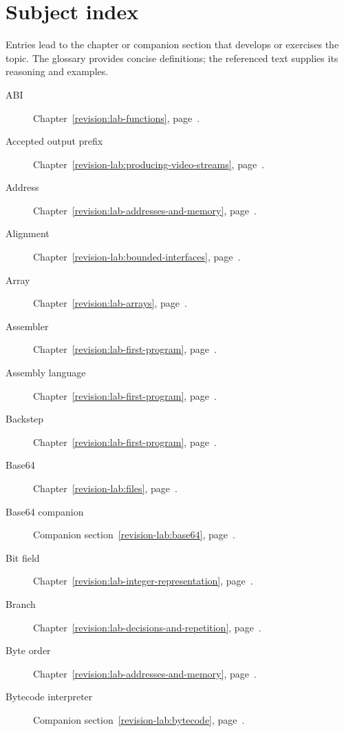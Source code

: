 \chapter*{Subject index}
\label{revision:subject-index}

Entries lead to the chapter or companion section that develops or exercises the topic. The glossary
provides concise definitions; the referenced text supplies its reasoning and examples.

\begin{description}
  \item[ABI] Chapter~\ref{revision:lab-functions}, page~\pageref{revision:lab-functions}.
  \item[Accepted output prefix] Chapter~\ref{revision-lab:producing-video-streams}, page~\pageref{revision-lab:producing-video-streams}.
  \item[Address] Chapter~\ref{revision:lab-addresses-and-memory}, page~\pageref{revision:lab-addresses-and-memory}.
  \item[Alignment] Chapter~\ref{revision-lab:bounded-interfaces}, page~\pageref{revision-lab:bounded-interfaces}.
  \item[Array] Chapter~\ref{revision:lab-arrays}, page~\pageref{revision:lab-arrays}.
  \item[Assembler] Chapter~\ref{revision:lab-first-program}, page~\pageref{revision:lab-first-program}.
  \item[Assembly language] Chapter~\ref{revision:lab-first-program}, page~\pageref{revision:lab-first-program}.
  \item[Backstep] Chapter~\ref{revision:lab-first-program}, page~\pageref{revision:lab-first-program}.
  \item[Base64] Chapter~\ref{revision-lab:files}, page~\pageref{revision-lab:files}.
  \item[Base64 companion] Companion section~\ref{revision-lab:base64}, page~\pageref{revision-lab:base64}.
  \item[Bit field] Chapter~\ref{revision:lab-integer-representation}, page~\pageref{revision:lab-integer-representation}.
  \item[Branch] Chapter~\ref{revision:lab-decisions-and-repetition}, page~\pageref{revision:lab-decisions-and-repetition}.
  \item[Byte order] Chapter~\ref{revision:lab-addresses-and-memory}, page~\pageref{revision:lab-addresses-and-memory}.
  \item[Bytecode interpreter] Companion section~\ref{revision-lab:bytecode}, page~\pageref{revision-lab:bytecode}.

\end{description}
